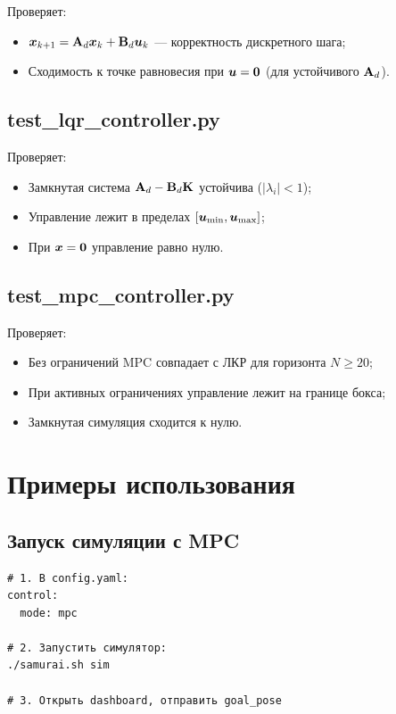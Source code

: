 Проверяет:
\begin{itemize}
  \item $\bm{x}_{k+1} = \mathbf{A}_d\bm{x}_k + \mathbf{B}_d\bm{u}_k$ ---
        корректность дискретного шага;
  \item Сходимость к точке равновесия при $\bm{u} = \bm{0}$
        (для устойчивого $\mathbf{A}_d$).
\end{itemize}

\subsection{test\_lqr\_controller.py}

Проверяет:
\begin{itemize}
  \item Замкнутая система $\mathbf{A}_d - \mathbf{B}_d\mathbf{K}$ устойчива
        ($|\lambda_i| < 1$);
  \item Управление лежит в пределах $[\bm{u}_{\min}, \bm{u}_{\max}]$;
  \item При $\bm{x} = \bm{0}$ управление равно нулю.
\end{itemize}

\subsection{test\_mpc\_controller.py}

Проверяет:
\begin{itemize}
  \item Без ограничений MPC совпадает с ЛКР для горизонта $N \geq 20$;
  \item При активных ограничениях управление лежит на границе бокса;
  \item Замкнутая симуляция сходится к нулю.
\end{itemize}

\section{Примеры использования}
\label{sec:examples}

\subsection{Запуск симуляции с MPC}

\begin{filebox}[title={Изменение режима регулятора}]
\begin{lstlisting}[basicstyle=\small\ttfamily]
# 1. В config.yaml:
control:
  mode: mpc

# 2. Запустить симулятор:
./samurai.sh sim

# 3. Открыть dashboard, отправить goal_pose
\end{lstlisting}
\end{filebox}

